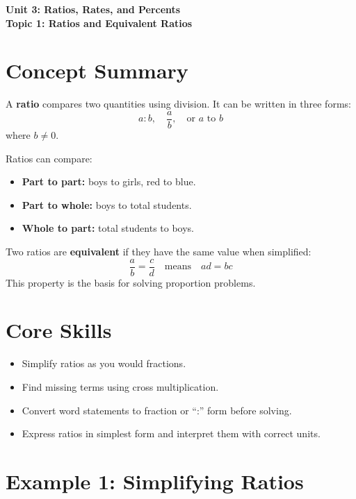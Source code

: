 \documentclass[14pt]{extarticle}
\begin{document}
\raggedright
{}

\begin{center}
    \LARGE \textbf{Unit 3: Ratios, Rates, and Percents} \\[6pt]
    \Large \textbf{Topic 1: Ratios and Equivalent Ratios}
\end{center}

\vspace{1em}

\section*{Concept Summary}

A \textbf{ratio} compares two quantities using division.  
It can be written in three forms:
\[
a:b, \quad \frac{a}{b}, \quad \text{or } a \text{ to } b
\]
where \(b \ne 0\).

Ratios can compare:
\begin{itemize}
    \item \textbf{Part to part:} boys to girls, red to blue.
    \item \textbf{Part to whole:} boys to total students.
    \item \textbf{Whole to part:} total students to boys.
\end{itemize}

Two ratios are \textbf{equivalent} if they have the same value when simplified:
\[
\frac{a}{b} = \frac{c}{d}
\quad \text{means} \quad ad = bc
\]
This property is the basis for solving proportion problems.

\section*{Core Skills}
\begin{itemize}
    \item Simplify ratios as you would fractions.
    \item Find missing terms using cross multiplication.
    \item Convert word statements to fraction or “:” form before solving.
    \item Express ratios in simplest form and interpret them with correct units.
\end{itemize}

\section*{Example 1: Simplifying Ratios}
\end{document}
